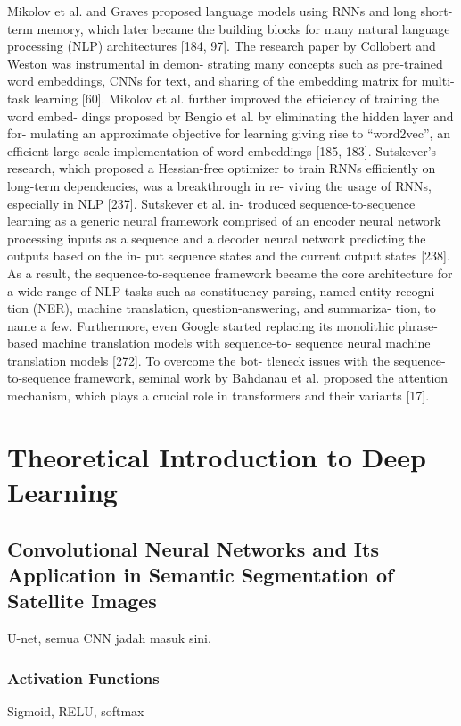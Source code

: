 Mikolov et al. and Graves proposed language models using RNNs
and long short-term memory, which later became the building blocks for
many natural language processing (NLP) architectures [184, 97]. The
research paper by Collobert and Weston was instrumental in demon-
strating many concepts such as pre-trained word embeddings, CNNs for
text, and sharing of the embedding matrix for multi-task learning [60].
Mikolov et al. further improved the efficiency of training the word embed-
dings proposed by Bengio et al. by eliminating the hidden layer and for-
mulating an approximate objective for learning giving rise to “word2vec”,
an efficient large-scale implementation of word embeddings [185, 183].
Sutskever’s research, which proposed a Hessian-free optimizer to train
RNNs efficiently on long-term dependencies, was a breakthrough in re-
viving the usage of RNNs, especially in NLP [237]. Sutskever et al. in-
troduced sequence-to-sequence learning as a generic neural framework
comprised of an encoder neural network processing inputs as a sequence
and a decoder neural network predicting the outputs based on the in-
put sequence states and the current output states [238]. As a result, the
sequence-to-sequence framework became the core architecture for a wide
range of NLP tasks such as constituency parsing, named entity recogni-
tion (NER), machine translation, question-answering, and summariza-
tion, to name a few. Furthermore, even Google started replacing its monolithic phrase-based machine translation models with sequence-to-
sequence neural machine translation models [272]. To overcome the bot-
tleneck issues with the sequence-to-sequence framework, seminal work
by Bahdanau et al. proposed the attention mechanism, which plays a
crucial role in transformers and their variants [17].

\section{Theoretical Introduction to Deep Learning}
\subsection{Convolutional Neural Networks and Its Application in Semantic Segmentation of Satellite Images}

U-net, semua CNN jadah masuk sini.
\subsubsection{Activation Functions}
Sigmoid, RELU, softmax

